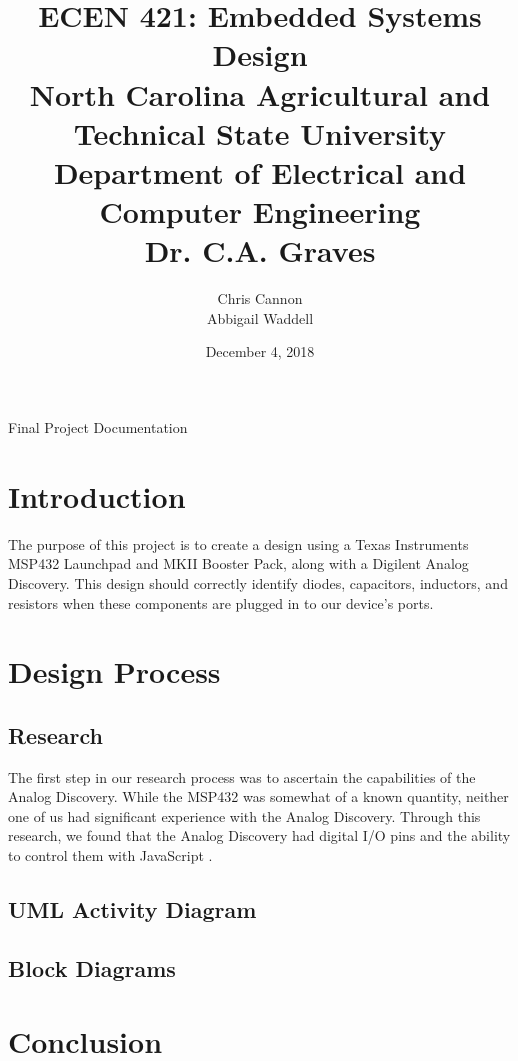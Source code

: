 \documentclass[12pt]{article}
\title {{\titleFont ECEN 421:  Embedded Systems Design \\ North Carolina Agricultural and Technical State University \\ Department of Electrical and Computer Engineering \\ Dr. C.A. Graves}} %
\author{\titleFont  Chris Cannon \\ \titleFont Abbigail Waddell} %
\date{\titleFont December 4, 2018}
\begin{document}
\begin{titlingpage}
\maketitle
\begin{center}
	Final Project Documentation
\end{center}
\end{titlingpage}

\tableofcontents

\pagebreak

\section{Introduction}
The purpose of this project is to create a design using a Texas Instruments MSP432 Launchpad and MKII Booster Pack, along with a Digilent Analog Discovery. This design should correctly identify diodes, capacitors, inductors, and resistors when these components are plugged in to our device's ports.

\section{Design Process}

\subsection{Research}
The first step in our research process was to ascertain the capabilities of the Analog Discovery. While the MSP432 was somewhat of a known quantity, neither one of us had significant experience with the Analog Discovery. Through this research, we found that the Analog Discovery had digital I/O pins and the ability to control them with JavaScript \cite{staticio} \cite{ioscript}.

\subsection{UML Activity Diagram}

\subsection{Block Diagrams}

\section{Conclusion}
\end{document}
